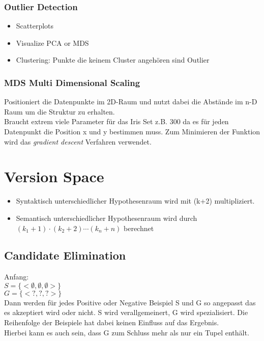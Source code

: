 \documentclass[a4paper]{scrartcl}
\begin{document}
\subsubsection{Outlier Detection}
\begin{itemize}
\setlength{\parskip}{-1pt}
\item Scatterplots
\item Visualize PCA or MDS
\item Clustering: Punkte die keinem Cluster angehören sind Outlier
\end{itemize}

\subsubsection{MDS Multi Dimensional Scaling}
Positioniert die Datenpunkte im 2D-Raum und nutzt dabei die Abstände im n-D Raum um die Struktur zu erhalten.\\
Braucht extrem viele Parameter für das Iris Set z.B. 300 da es für jeden Datenpunkt die Position x und y bestimmen muss. Zum Minimieren der Funktion wird das \textit{gradient descent} Verfahren verwendet.

\section{Version Space}
\begin{itemize}
\setlength{\parskip}{0pt}
\item Syntaktisch unterschiedlicher Hypothesenraum wird mit (k+2) multipliziert.
\item Semantisch unterschiedlicher Hypothesenraum wird durch $(k_1+1)\cdot(k_2+2)\cdots(k_n+n)$ berechnet
\end{itemize}

\subsection{Candidate Elimination}
Anfang:\\
$S=\{<\emptyset, \emptyset, \emptyset>\}$\\
$G=\{<?, ?,?>\}$\\
Dann werden für jedes Positive oder Negative Beispiel S und G so angepasst das es akzeptiert wird oder nicht. S wird verallgemeinert, G wird spezialisiert. Die Reihenfolge der Beispiele hat dabei keinen Einfluss auf das Ergebnis.\\
Hierbei kann es auch sein, dass G zum Schluss mehr als nur ein Tupel enthält.
\end{document}
